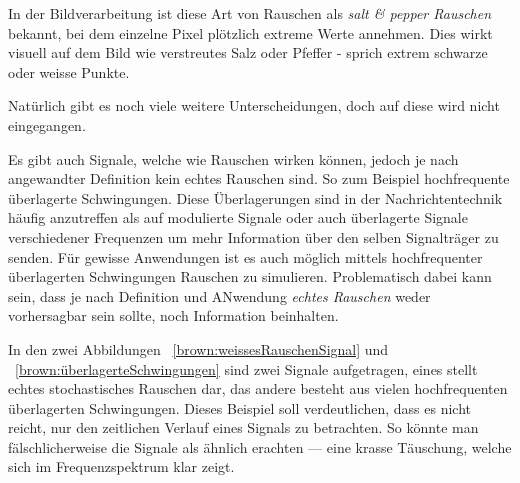 In der Bildverarbeitung ist diese Art von Rauschen als \textit{salt \& pepper Rauschen} bekannt, bei dem einzelne Pixel plötzlich extreme Werte annehmen. Dies wirkt visuell auf dem Bild wie verstreutes Salz oder Pfeffer - sprich extrem schwarze oder weisse Punkte.


Natürlich gibt es noch viele weitere Unterscheidungen, doch auf diese wird nicht eingegangen.


Es gibt auch Signale, welche wie Rauschen wirken können, jedoch je nach angewandter Definition kein echtes Rauschen sind. So zum Beispiel hochfrequente überlagerte Schwingungen. Diese Überlagerungen sind in der Nachrichtentechnik häufig anzutreffen als auf modulierte Signale oder auch überlagerte Signale verschiedener Frequenzen um mehr Information über den selben Signalträger zu senden. 
Für gewisse Anwendungen ist es auch möglich mittels hochfrequenter überlagerten Schwingungen Rauschen zu simulieren. Problematisch dabei kann sein, dass je nach Definition und ANwendung \textit{echtes Rauschen} weder vorhersagbar sein sollte, noch Information beinhalten. 


In den zwei Abbildungen ~\ref{brown:weissesRauschenSignal} und ~\ref{brown:überlagerteSchwingungen} sind zwei Signale aufgetragen, eines stellt echtes stochastisches Rauschen dar, das andere besteht aus vielen hochfrequenten überlagerten Schwingungen. Dieses Beispiel soll verdeutlichen, dass es nicht reicht, nur den zeitlichen Verlauf eines Signals zu betrachten. So könnte man fälschlicherweise die Signale als ähnlich erachten --- eine krasse Täuschung, welche sich im Frequenzspektrum klar zeigt. 

